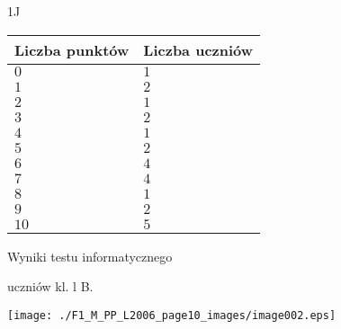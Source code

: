\documentclass[a4paper,12pt]{article}
\begin{document}
1J
\begin{center}
\begin{tabular}{|l|l|}
\hline
\multicolumn{1}{|l|}{Liczba punktów}&	\multicolumn{1}{|l|}{Liczba uczniów}	\\
\hline
\multicolumn{1}{|l|}{$0$}&	\multicolumn{1}{|l|}{ $1$}	\\
\hline
\multicolumn{1}{|l|}{ $1$}&	\multicolumn{1}{|l|}{ $2$}	\\
\hline
\multicolumn{1}{|l|}{ $2$}&	\multicolumn{1}{|l|}{ $1$}	\\
\hline
\multicolumn{1}{|l|}{ $3$}&	\multicolumn{1}{|l|}{ $2$}	\\
\hline
\multicolumn{1}{|l|}{ $4$}&	\multicolumn{1}{|l|}{ $1$}	\\
\hline
\multicolumn{1}{|l|}{ $5$}&	\multicolumn{1}{|l|}{ $2$}	\\
\hline
\multicolumn{1}{|l|}{ $6$}&	\multicolumn{1}{|l|}{ $4$}	\\
\hline
\multicolumn{1}{|l|}{ $7$}&	\multicolumn{1}{|l|}{ $4$}	\\
\hline
\multicolumn{1}{|l|}{ $8$}&	\multicolumn{1}{|l|}{ $1$}	\\
\hline
\multicolumn{1}{|l|}{ $9$}&	\multicolumn{1}{|l|}{ $2$}	\\
\hline
\multicolumn{1}{|l|}{ $10$}&	\multicolumn{1}{|l|}{ $5$}	\\
\hline
\end{tabular}

\end{center}
Wyniki testu informatycznego

uczniów kl. l B.
\begin{center}
\texttt{[image: ./F1\_M\_PP\_L2006\_page10\_images/image002.eps]}
\end{center}
\end{document}
